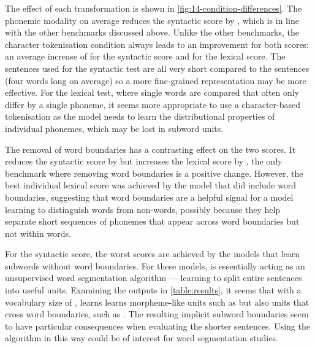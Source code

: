 The effect of each transformation is shown in \cref{fig:14-condition-differences}. The phonemic modality on average reduces the syntactic score by , which is in line with the other benchmarks discussed above. Unlike the other benchmarks, the character tokenisation condition always leads to an improvement for both \babyslm scores: an average increase of  for the syntactic score and  for the lexical score. The sentences used for the syntactic test are all very short compared to the \blimp sentences (four words long on average) so a more fine-grained representation may be more effective. For the lexical test, where single words are compared that often only differ by a single phoneme, it seems more appropriate to use a character-based tokenisation as the model needs to learn the distributional properties of individual phonemes, which may be lost in subword units. 

The removal of word boundaries has a contrasting effect on the two scores. It reduces the syntactic score by  but increases the lexical score by , the only benchmark where removing word boundaries is a positive change. However, the best individual lexical score was achieved by the model that did include word boundaries, suggesting that word boundaries are a helpful signal for a model learning to distinguish words from non-words, possibly because they help separate short sequences of phonemes that appear across word boundaries but not within words. 



For the syntactic score, the worst scores are achieved by the models that learn subwords without word boundaries. For these models, \bpe is essentially acting as an unsupervised word segmentation algorithm --- learning to split entire sentences into useful units. Examining the outputs in \cref{table:results}, it seems that with a vocabulary size of , \bpe learns learns morpheme-like units such as  but also units that cross word boundaries, such as . The resulting implicit subword boundaries seem to have particular consequences when evaluating the shorter \babyslm sentences. Using the \bpe algorithm in this way could be of interest for word segmentation studies. 

